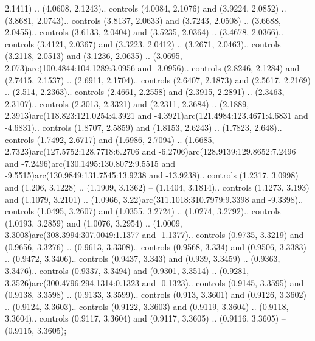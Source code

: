 2.1411) .. (4.0608, 2.1243).. controls (4.0084, 2.1076) and (3.9224, 2.0852) .. (3.8681, 2.0743).. controls (3.8137, 2.0633) and (3.7243, 2.0508) .. (3.6688, 2.0455).. controls (3.6133, 2.0404) and (3.5235, 2.0364) .. (3.4678, 2.0366).. controls (3.4121, 2.0367) and (3.3223, 2.0412) .. (3.2671, 2.0463).. controls (3.2118, 2.0513) and (3.1236, 2.0635) .. (3.0695, 2.073)arc(100.4844:104.1289:3.0956 and -3.0956).. controls (2.8246, 2.1284) and (2.7415, 2.1537) .. (2.6911, 2.1704).. controls (2.6407, 2.1873) and (2.5617, 2.2169) .. (2.514, 2.2363).. controls (2.4661, 2.2558) and (2.3915, 2.2891) .. (2.3463, 2.3107).. controls (2.3013, 2.3321) and (2.2311, 2.3684) .. (2.1889, 2.3913)arc(118.823:121.0254:4.3921 and -4.3921)arc(121.4984:123.4671:4.6831 and -4.6831).. controls (1.8707, 2.5859) and (1.8153, 2.6243) .. (1.7823, 2.648).. controls (1.7492, 2.6717) and (1.6986, 2.7094) .. (1.6685, 2.7323)arc(127.5752:128.7718:6.2706 and -6.2706)arc(128.9139:129.8652:7.2496 and -7.2496)arc(130.1495:130.8072:9.5515 and -9.5515)arc(130.9849:131.7545:13.9238 and -13.9238).. controls (1.2317, 3.0998) and (1.206, 3.1228) .. (1.1909, 3.1362) -- (1.1404, 3.1814).. controls (1.1273, 3.193) and (1.1079, 3.2101) .. (1.0966, 3.22)arc(311.1018:310.7979:9.3398 and -9.3398).. controls (1.0495, 3.2607) and (1.0355, 3.2724) .. (1.0274, 3.2792).. controls (1.0193, 3.2859) and (1.0076, 3.2954) .. (1.0009, 3.3008)arc(308.3994:307.0049:1.1377 and -1.1377).. controls (0.9735, 3.3219) and (0.9656, 3.3276) .. (0.9613, 3.3308).. controls (0.9568, 3.334) and (0.9506, 3.3383) .. (0.9472, 3.3406).. controls (0.9437, 3.343) and (0.939, 3.3459) .. (0.9363, 3.3476).. controls (0.9337, 3.3494) and (0.9301, 3.3514) .. (0.9281, 3.3526)arc(300.4796:294.1314:0.1323 and -0.1323).. controls (0.9145, 3.3595) and (0.9138, 3.3598) .. (0.9133, 3.3599).. controls (0.913, 3.3601) and (0.9126, 3.3602) .. (0.9124, 3.3603).. controls (0.9122, 3.3603) and (0.9119, 3.3604) .. (0.9118, 3.3604).. controls (0.9117, 3.3604) and (0.9117, 3.3605) .. (0.9116, 3.3605) -- (0.9115, 3.3605);



